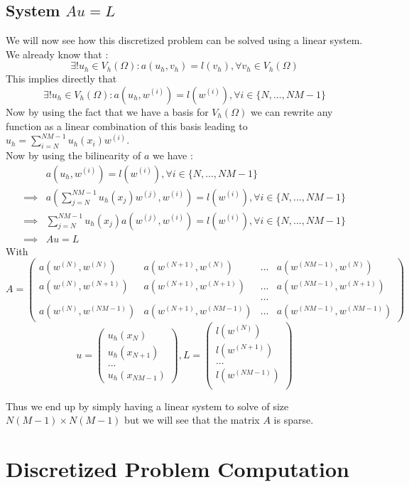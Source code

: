 \documentclass[a4paper]{report}
\begin{document}
\section{System $Au=L$}
We will now see how this discretized problem can be solved using a linear system. We already know that : 
\[
\exists ! u_h \in V_h(\Omega) : a(u_h,v_h)=l(v_h), \forall v_h \in V_h(\Omega)
\]
This implies directly that 
\[
\exists ! u_h \in V_h(\Omega) : a(u_h,w^{(i)})=l(w^{(i)}), \forall i \in \{ N,...,NM-1\}
\]
Now by using the fact that we have a basis for $V_h(\Omega)$ we can rewrite any function as a linear combination of this basis leading to $u_h=\sum_{i=N}^{NM-1} u_h(x_i)w^{(i)}$.
\\
Now by using the bilinearity of $a$ we have :
\begin{align*}
&a(u_h,w^{(i)})=l(w^{(i)}), \forall i \in \{ N,...,NM-1\}\\
\implies & a(\sum_{j=N}^{NM-1} u_h(x_j)w^{(j)},w^{(i)})=l(w^{(i)}), \forall i \in \{ N,...,NM-1\}\\
\implies & \sum_{j=N}^{NM-1} u_h(x_j)a(w^{(j)},w^{(i)})=l(w^{(i)}), \forall i \in \{ N,...,NM-1\}\\
 \implies & Au=L
\end{align*}
With 
\[
A=\left(\begin{matrix}
a(w^{(N)},w^{(N)}) & a(w^{(N+1)},w^{(N)}) & ... & a(w^{(NM-1)},w^{(N)})\\
a(w^{(N)},w^{(N+1)}) & a(w^{(N+1)},w^{(N+1)}) & ... & a(w^{(NM-1)},w^{(N+1)})\\
 & &...&\\
a(w^{(N)},w^{(NM-1)}) & a(w^{(N+1)},w^{(NM-1)}) & ... & a(w^{(NM-1)},w^{(NM-1)})
\end{matrix} \right)
\]
\[
u=\left( 
\begin{matrix}
u_h(x_N)\\
u_h(x_{N+1})\\
...\\
u_h(x_{NM-1}) 
\end{matrix}\right) 
,
L=\left( 
\begin{matrix}
 l(w^{(N)})\\
 l(w^{(N+1)})\\
...\\
 l(w^{(NM-1)})\\  
 \end{matrix}\right)
\]


Thus we end up by simply having a linear system to solve of size $N(M-1)\times N(M-1)$ but we will see that the matrix $A$ is sparse.
\chapter{Discretized Problem Computation}
\end{document}
